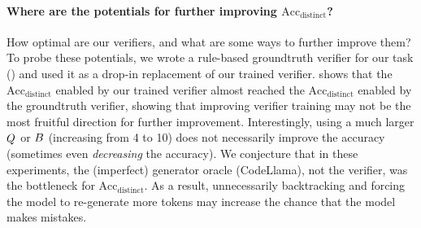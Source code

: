 \paragraph{Where are the potentials for further improving $\text{Acc}_\text{distinct}$?}
How optimal are our verifiers,
and what are some ways to further improve them?
To probe these potentials,
we wrote a rule-based groundtruth verifier for our task ()
and used it as a drop-in replacement of our trained verifier.
 shows that 
the $\text{Acc}_\text{distinct}$ enabled by our trained verifier almost reached the $\text{Acc}_\text{distinct}$ enabled by the groundtruth verifier,
showing that improving verifier training may not be the most fruitful direction for further improvement.
Interestingly, using a much larger $Q$ or $B$ (increasing from 4 to 10) 
does not necessarily improve the accuracy (sometimes even \emph{decreasing} the accuracy).
We conjecture that in these experiments, 
the (imperfect) generator oracle (CodeLlama),
not the verifier,
was the bottleneck for $\text{Acc}_\text{distinct}$.
As a result,
unnecessarily backtracking and forcing the model to re-generate more tokens may increase the chance that the model makes mistakes.


